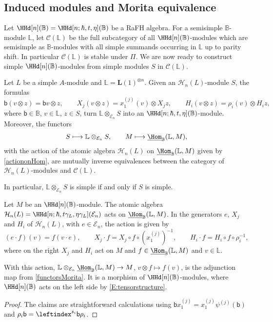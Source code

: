 \documentclass[a4paper,11pt]{amsart}
\newcommand{\uHom}{\underline{\Hom}}
\numberwithin{equation}{subsection}
\theoremstyle{definition}
\theoremstyle{theorem}
\theoremstyle{remark}
\newcommand\bb{\mathsf{b}}
\newcommand{\Bo}{\mathbb{B}}
\newcommand{\Lo}{\mathbb{L}}
\begin{document}
\subsection{Induced modules and Morita equivalence}
 Let $\HHd[n](\Bo)=\HHd[n;\hbar,t,\eta](\Bo)$ be a RaFH algebra. For a semisimple $\Bo$-module $\Lo$, let  $\mathcal C(\Lo)$ be the  full subcategory of all $\HHd[n](\Bo)$-modules which are semisimple as
  $\Bo$-modules with all simple summands occurring in $\Lo$ up to parity shift.  In particular $\mathcal C(\Lo)$ is stable under $\Pi$. We are now ready to construct simple $\HHd[n](\Bo)$-modules from simple modules $S$ in  $\mathcal C(\Lo)$.

\begin{Theorem}\label{T:Morita}
  Let $L$ be a simple $A$-module and $\Lo=\mathbf L(1)^{\otimes n}$. Given an
  $\mathcal H_n(L)$-module $S$, the formulas
   \begin{equation}\label{E:tensorstructure}
    \bb(v\otimes z)=\bb v\otimes z,\qquad
    X_j(v\otimes z)=x_1^{(j)}(v)\otimes X_jz,\qquad
    H_i(v\otimes z)=\rho_i(v)\otimes H_iz,
  \end{equation}
   where  $\bb\in\Bo$, $v\in\Lo$, $z\in S$, turn  $\Lo\otimes_{\mathcal E_n}S$ into an
  $\HHd[n;\hbar,t,\eta](\Bo)$-module.
  Moreover, the functors
  \begin{equation}\label{functorsMorita}
    S\longmapsto\Lo\otimes_{\mathcal E_n}S,\qquad
    M\longmapsto\uHom_{\Bo}(\Lo,M),
  \end{equation}
  with the action of the  atomic algebra $\mathcal H_n(L)$ on $\uHom_{\Bo}(\Lo,M)$ given by \autoref{actiononHom}, are mutually inverse equivalences between the category of
  $\mathcal H_n(L)$-modules and $\mathcal C(\Lo)$.

In particular, $\Lo\otimes_{\mathcal E_n}S$ is simple if and only if $S$ is simple.
\end{Theorem}


\begin{Lemma}\label{actiononHom}
  Let $M$ be an $\HHd[n](\Bo)$-module. The atomic algebra $\mathcal H_n(L)=\HHd[n;\hbar,t\gamma_L,\eta\gamma_L](\mathcal E_n)$ acts on $\uHom_{\Bo}(\Lo,M)$. In the generators  $e$, $X_j$ and $H_i$ of $\mathcal H_n(L)$,  with  $e\in\mathcal E_n$, the action is given by
  \[
    (e\cdot f)(v)=f(v\cdot e),\qquad
    X_j\cdot f=X_j\circ f\circ(x_1^{(j)})^{-1},\qquad
    H_i\cdot f=H_i\circ f\circ\rho_i^{-1},
  \]
  where on the right $X_j$ and $H_i$ act on $M$ and $f\in \uHom_{\Bo}(\Lo,M)$ and $v\in \Lo$.

  With this action,  $\Lo\otimes_{\mathcal E_n}\uHom_{\Bo}(\Lo,M)\to M$, $v\otimes f\mapsto f(v)$, is the adjunction map from \autoref{functorsMorita}. It is a morphism of $\HHd[n](\Bo)$-modules, where $\HHd[n](\Bo)$ acts on the left side by \autoref{E:tensorstructure}.
\end{Lemma}
\begin{proof}
The claims are straightforward calculations using $\bb x_1^{(j)}=x_1^{(j)}\psi^{(j)}(\bb)$ and $\rho_i\bb=\leftindex^{s_i}\bb\rho_i$.
\end{proof}
\end{document}
